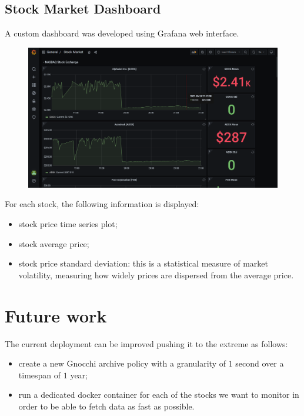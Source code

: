 \documentclass[11pt,a4paper]{article}
\begin{document}
\subsection{Stock Market Dashboard}
A custom dashboard was developed using Grafana web interface.
\begin{figure}[H]
    \centering
    \includegraphics[scale=0.41]{imgs/grafana-dashboard.PNG}
\end{figure}
\noindent
For each stock, the following information is displayed:
\begin{itemize}
    \item stock price time series plot;
    \item stock average price;
    \item stock price standard deviation: this is a statistical measure of market volatility, measuring how widely prices are dispersed from the average price.
\end{itemize}
\section{Future work}
The current deployment can be improved pushing it to the extreme as follows:
\begin{itemize}
    \item create a new Gnocchi archive policy with a granularity of $1$ second over a timespan of $1$ year;
    \item run a dedicated docker container for each of the stocks we want to monitor in order to be able to fetch data as fast as possible.
\end{itemize}
\end{document}
